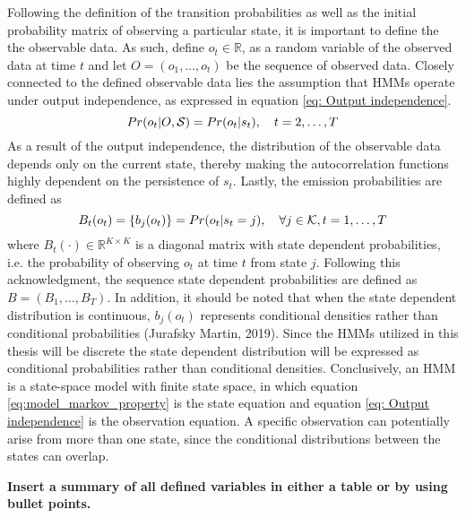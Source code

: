Following the definition of the transition probabilities as well as the initial probability matrix of observing a particular state, it is important to define the the observable data. As such, define $o_t \in \mathbb{R}$, as a random variable of the observed data at time $t$ and let $O=(o_1,\ldots,o_t)$ be the sequence of observed data. Closely connected to the defined observable data lies the assumption that HMMs operate under output independence, as expressed in equation \ref{eq: Output independence}.
\begin{equation}
    Pr(o_t|O, \S) = Pr(o_t|s_t),
    \quad t=2,\ldots,T
    \label{eq: Output independence}
\end{equation}
As a result of the output independence, the distribution of the observable data depends only on the current state, thereby making the autocorrelation functions highly dependent on the persistence of $s_t$. Lastly, the emission probabilities are defined as
\begin{equation}
    B_t(o_t)=\{ b_j(o_t) \}=Pr(o_t|s_t=j), \quad \forall j \in \operatorname{\mathcal{K}}, t=1,\ldots,T 
\end{equation}
where $B_t(\cdot)\in \mathbb{R}^{K\times K}$ is a diagonal matrix with state dependent probabilities, i.e. the probability of observing $o_t$ at time $t$ from state $j$. Following this acknowledgment, the sequence state dependent probabilities are defined as $B=(B_1,\ldots,B_T)$. In addition, it should be noted that when the state dependent distribution is continuous, $b_j(o_t)$ represents conditional densities rather than conditional probabilities (Jurafsky Martin, 2019). Since the HMMs utilized in this thesis will be discrete the state dependent distribution will be expressed as conditional probabilities rather than conditional densities. Conclusively, an HMM is a state-space model with finite state space, in which equation \ref{eq:model_markov_property} is the state equation and equation \ref{eq: Output independence} is the observation equation. A specific observation can potentially arise from more than one state, since the conditional distributions between the states can overlap.

\textbf{Insert a summary of all defined variables in either a table or by using bullet points.}

